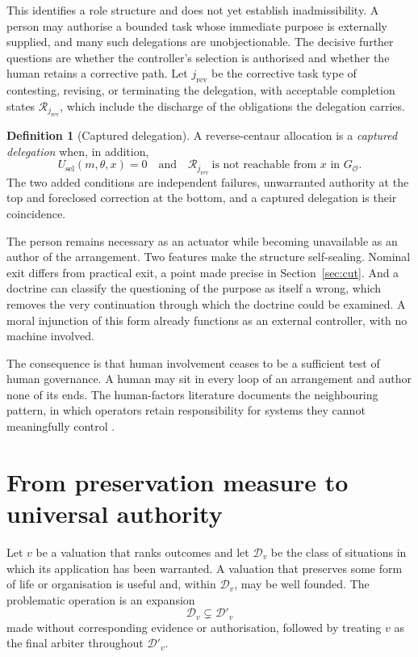 \documentclass[11pt]{article}
\theoremstyle{definition}
\newtheorem{definition}{Definition}
\theoremstyle{remark}
\begin{document}
This identifies a role structure and does not yet establish inadmissibility. A person may authorise a bounded task whose immediate purpose is externally supplied, and many such delegations are unobjectionable. The decisive further questions are whether the controller's selection is authorised and whether the human retains a corrective path. Let $j_{\mathrm{rev}}$ be the corrective task type of contesting, revising, or terminating the delegation, with acceptable completion states $\mathcal R_{j_{\mathrm{rev}}}$, which include the discharge of the obligations the delegation carries.

\begin{definition}[Captured delegation]
A reverse-centaur allocation is a \emph{captured delegation} when, in addition,
\[
U_{\mathrm{sel}}(m,\theta,x)=0
\quad\text{and}\quad
\mathcal R_{j_{\mathrm{rev}}}\ \text{is not reachable from }x\text{ in }G_{\mathcal O}.
\]
The two added conditions are independent failures, unwarranted authority at the top and foreclosed correction at the bottom, and a captured delegation is their coincidence.
\end{definition}

The person remains necessary as an actuator while becoming unavailable as an author of the arrangement. Two features make the structure self-sealing. Nominal exit differs from practical exit, a point made precise in Section~\ref{sec:cut}. And a doctrine can classify the questioning of the purpose as itself a wrong, which removes the very continuation through which the doctrine could be examined. A moral injunction of this form already functions as an external controller, with no machine involved.

The consequence is that human involvement ceases to be a sufficient test of human governance. A human may sit in every loop of an arrangement and author none of its ends. The human-factors literature documents the neighbouring pattern, in which operators retain responsibility for systems they cannot meaningfully control \cite{bainbridge1983,parasuraman1997,elish2019}.

\section{From preservation measure to universal authority}

Let $v$ be a valuation that ranks outcomes and let $\mathcal D_v$ be the class of situations in which its application has been warranted. A valuation that preserves some form of life or organisation is useful and, within $\mathcal D_v$, may be well founded. The problematic operation is an expansion
\[
\mathcal D_v\subsetneq\mathcal D'_v
\]
made without corresponding evidence or authorisation, followed by treating $v$ as the final arbiter throughout $\mathcal D'_v$.
\end{document}
